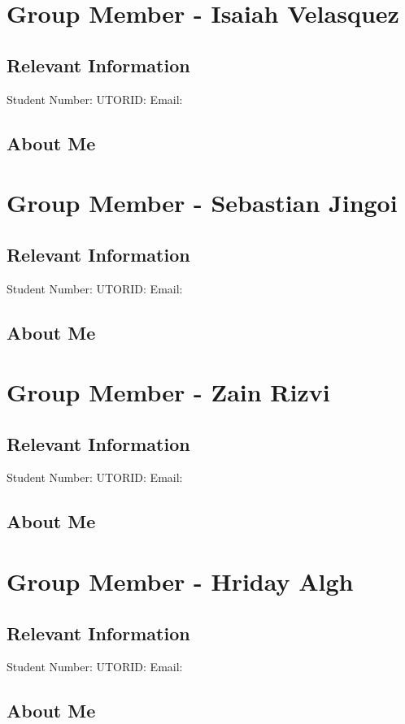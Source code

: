 \documentclass{article}
\begin{document}
\section{Group Member - Isaiah Velasquez}
\subsection{Relevant Information}
    Student Number:  \newline
    UTORID:  \newline
    Email: 
\subsection{About Me}

\noindent\makebox[\linewidth]{\rule{\paperwidth}{0.4pt}}

\section{Group Member - Sebastian Jingoi}
\subsection{Relevant Information}
    Student Number:  \newline
    UTORID:  \newline
    Email: 
\subsection{About Me}

\noindent\makebox[\linewidth]{\rule{\paperwidth}{0.4pt}}

\section{Group Member - Zain Rizvi}
\subsection{Relevant Information}
    Student Number:  \newline
    UTORID:  \newline
    Email: 
\subsection{About Me}

\noindent\makebox[\linewidth]{\rule{\paperwidth}{0.4pt}}

\section{Group Member - Hriday Algh}
\subsection{Relevant Information}
    Student Number:  \newline
    UTORID:  \newline
    Email: 
\subsection{About Me}
\end{document}
